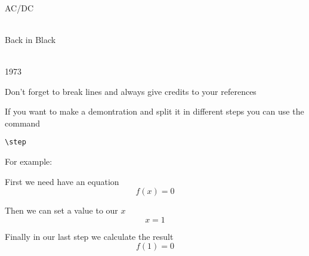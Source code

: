\documentclass[12pt]{article}
\title{ \Titulo}
\author{\Autor}
\date{\Data}
\begin{document}

    
    \\
        AC/DC 
        
    \\
        Back in Black

    \\
       1973 
        
        
Don't forget to break lines and always give credits to your references

If you want to make a demontration and split it in different steps you can use
the command 
\begin{verbatim}
\step
\end{verbatim}

For example:

\step First we need have an equation
\[f(x)=0\]

\step Then we can set a value to our $x$
\[x=1\]

\step Finally in our last step we calculate the result
\[f(1)=0\]
\end{document}
